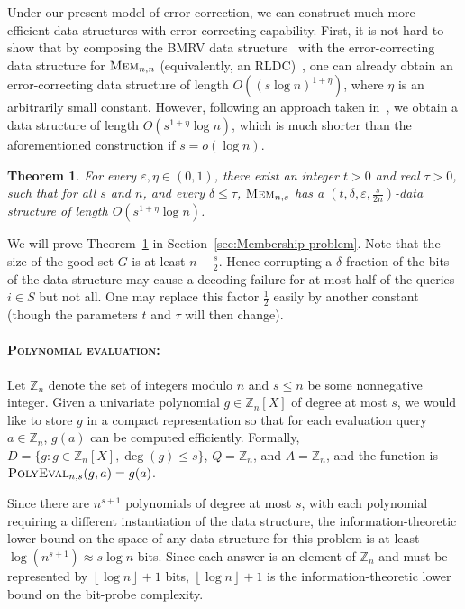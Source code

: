 \documentclass[11pt,english]{article}
\newcommand{\noun}[1]{\textsc{#1}}
\newtheorem{theorem}{Theorem}
\theoremstyle{definition}
\theoremstyle{remark}
\newcommand{\eps}{\varepsilon}
\newcommand{\Z}{\mathbb{Z}}
\newcommand{\mem}{\mbox{\textsc{Mem}}}
\newcommand{\polyeval}{\mbox{\textsc{PolyEval}}}
\begin{document}
Under our present model of error-correction, we can construct much
more efficient data structures with error-correcting capability. First,
it is not hard to show that by composing the BMRV data structure~\cite{bmrv:bitvectorsj}
with the error-correcting data structure for $\mem_{n,n}$ (equivalently,
an RLDC)~\cite{bghsv04}, one can already obtain an error-correcting
data structure of length $O((s\log n)^{1+\eta})$, where $\eta$ is
an arbitrarily small constant. However, following an approach taken
in~\cite{wolf:ecdata}, we obtain a data structure of length $O(s^{1+\eta}\log n)$,
which is much shorter than the aforementioned construction if $s=o(\log n)$.

\begin{theorem}\label{thm:membership} For every $\eps,\eta\in(0,1)$,
there exist an integer $t>0$ and real $\tau>0$, such that for
all $s$ and $n$, and every $\delta\leq\tau$, $\mem_{n,s}$ has
a $(t,\delta,\eps,\frac{s}{2n})$-data structure of length $O(s^{1+\eta}\log n)$.
\end{theorem}

We will prove Theorem~\ref{thm:membership} in Section~\ref{sec:Membership problem}.
Note that the size of the good set $G$ is at least $n-\frac{s}{2}$.
Hence corrupting a $\delta$-fraction of the bits of the data structure
may cause a decoding failure for at most half of the queries $i\in S$
but not all. One may replace this factor $\frac{1}{2}$ easily by
another constant (though the parameters $t$ and $\tau$ will then
change).


\paragraph{\bf{\noun{Polynomial evaluation:}}}

Let $\Z_{n}$ denote the set of integers modulo $n$ and $s\leq n$
be some nonnegative integer. Given a univariate polynomial $g\in\Z_{n}[X]$
of degree at most $s$, we would like to store $g$ in a compact representation
so that for each evaluation query $a\in\Z_{n}$, $g(a)$ can be computed
efficiently. Formally, $D=\{g:g\in\Z_{n}[X],\deg(g)\leq s\}$, $Q=\Z_{n}$,
and $A=\Z_{n}$, and the function is $\polyeval_{n,s}(g,a)=g(a)$.

Since there are $n^{s+1}$ polynomials of degree at most $s$, with
each polynomial requiring a different instantiation of the data structure,
the information-theoretic lower bound on the space of any data structure
for this problem is at least $\log(n^{s+1})\approx s\log n$
bits. Since each answer is an element of $\Z_{n}$ and must be
represented by $\left\lfloor \log n\right\rfloor +1$ bits, $\left\lfloor \log n\right\rfloor +1$
is the information-theoretic lower bound on the bit-probe complexity.
\end{document}
